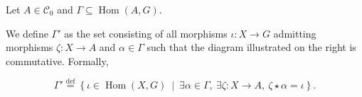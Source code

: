 



\begin{definition}
    \label{def:weight_excluding}
    Let \( A \mathop{\in} \mathcal{C}_0 \) and $\Gamma \mathop{\subseteq} \operatorname{Hom}(A,G)$.
    \newline
    \noindent
    \begin{minipage}{0.6\textwidth}
        We define $\Gamma'$ as the set consisting of all morphisms \( \iota : X \mathop{\to} G \) admitting morphisms \( \zeta \mathop{\colon} X \mathop{\to} A \) and \( \alpha \mathop{\in} \Gamma \) such that the diagram illustrated on the right is commutative. Formally, 
    \end{minipage}
    \begin{minipage}{0.4\textwidth}
        \hfill 
    \end{minipage}

    \[
    \Gamma' \overset{\operatorname{def}}{=} \left\{ \iota \mathop{\in} \operatorname{Hom}(X, G)~\middle|~\exists \alpha \mathop{\in} \Gamma,~\exists \zeta:X \mathop{\to} A,~\zeta \mathop{\star} \alpha \mathop{=} \iota \right\}.
    \]


\end{definition}
